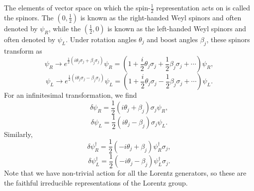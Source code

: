 \documentclass[11pt]{article}
\theoremstyle{definition}
\begin{document}
The elements of vector space on which the spin-$\frac{1}{2}$ representation acts on is called the spinors. The $(0,\frac{1}{2})$ is known as the right-handed Weyl spinors and often denoted by $\psi_R$, while the $(\frac{1}{2},0)$ is known as the left-handed Weyl spinors and often denoted by $\psi_L$. Under rotation angles $\theta_j$ and boost angles $\beta_j$, these spinors transform as
\begin{equation}
    \psi_R \rightarrow e^{\frac{1}{2}(i\theta_j\sigma_j + \beta_j\sigma_j)}\psi_R = \left( 1 + \frac{i}{2}\theta_j\sigma_j + \frac{1}{2}\beta_j \sigma_j + \cdots   \right)\psi_R,
\end{equation}
\begin{equation}
    \psi_L \rightarrow e^{\frac{1}{2}(i\theta_j\sigma_j - \beta_j\sigma_j)}\psi_L = \left( 1 + \frac{i}{2}\theta_j\sigma_j - \frac{1}{2}\beta_j \sigma_j + \cdots   \right)\psi_L.
\end{equation}
For an infinitesimal transformation, we find
\begin{equation}
    \delta\psi_R = \frac{1}{2}(i\theta_j + \beta_j)\sigma_j\psi_R,
\end{equation}
\begin{equation}
    \delta\psi_L = \frac{1}{2}(i\theta_j - \beta_j)\sigma_j\psi_L.
\end{equation}
Similarly, 
\begin{equation}
    \delta\psi_R^\dagger = \frac{1}{2}(-i\theta_j + \beta_j)\psi_R^\dagger\sigma_j,
    \label{Eq. infinitesimal1}
\end{equation}
\begin{equation}
    \delta\psi_L^\dagger = \frac{1}{2}(-i\theta_j - \beta_j)\psi_L^\dagger\sigma_j.
    \label{Eq. infinitesimal2}
\end{equation}
Note that we have non-trivial action for all the Lorentz generators, so these are the faithful irreducible representations of the Lorentz group.
\end{document}
